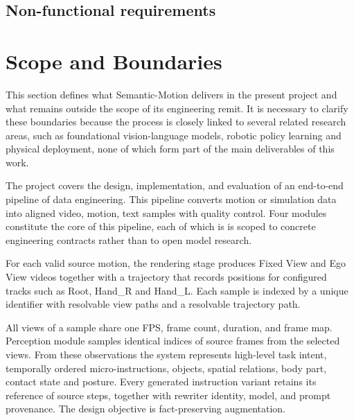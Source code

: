 \documentclass[11pt,oneside]{report}
\begin{document}
\subsection*{Non-functional requirements}

\section{Scope and Boundaries}
This section defines what Semantic-Motion delivers in the present project and what remains outside the scope of its engineering remit. It is necessary to clarify these boundaries because the process is closely linked to several related research areas, such as foundational vision-language models, robotic policy learning and physical deployment, none of which form part of the main deliverables of this work.

The project covers the design, implementation, and evaluation of an end-to-end pipeline of data engineering. This pipeline converts motion or simulation data into aligned video, motion, text samples with quality control. Four modules constitute the core of this pipeline, each of which is is scoped to concrete engineering contracts rather than to open model research. 

For each valid source motion, the rendering stage produces Fixed View and Ego View videos together with a trajectory that records positions for configured tracks such as Root, Hand\_R and Hand\_L. Each sample is indexed by a unique identifier with resolvable view paths and a resolvable trajectory path.

All views of a sample share one FPS, frame count, duration, and frame map. Perception module samples identical indices of source frames from the selected views. From these observations the system represents high-level task intent, temporally ordered micro-instructions, objects, spatial relations, body part, contact state and posture. Every generated instruction variant retains its reference of source steps, together with rewriter identity, model, and prompt provenance. The design objective is fact-preserving augmentation.
\end{document}
